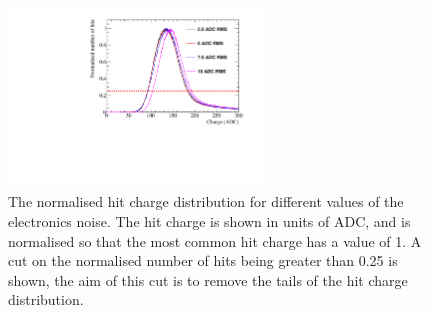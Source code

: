 \begin{figure}
  \centering
  \includegraphics[width=0.6\textwidth]{Canvas_ChargeCut_NoiseLevel}
  \caption[The normalised hit charge distribution for different values of the electronics noise]
          {The normalised hit charge distribution for different values of the electronics noise. The hit charge is shown in units of ADC, and is normalised so that the most common hit charge has a value of 1. A cut on the normalised number of hits being greater than 0.25 is shown, the aim of this cut is to remove the tails of the hit charge distribution.}
  \label{fig:DiffNoiseStudy_ChargeCut}
\end{figure}


